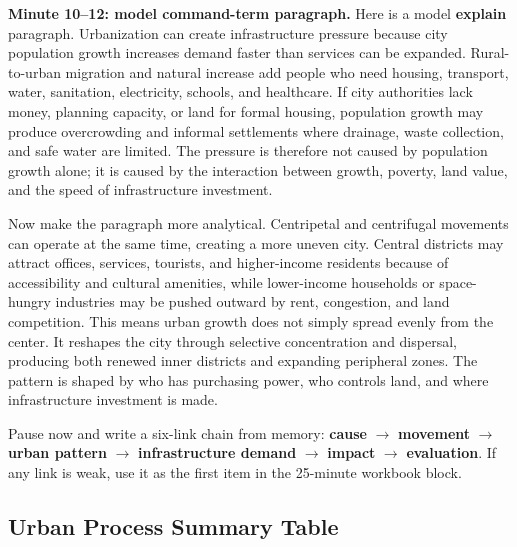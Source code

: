 \documentclass[11pt,a4paper]{article}
\newcommand{\term}[1]{\textcolor{HeadingBlue}{\textbf{#1}}}
\newcommand{\exam}[1]{\textcolor{AccentTeal}{\textbf{#1}}}
\begin{document}
\textbf{Minute 10--12: model command-term paragraph.}
Here is a model \exam{explain} paragraph. Urbanization can create
infrastructure pressure because city population growth increases demand faster
than services can be expanded. Rural-to-urban migration and natural increase add
people who need housing, transport, water, sanitation, electricity, schools, and
healthcare. If city authorities lack money, planning capacity, or land for
formal housing, population growth may produce overcrowding and informal
settlements where drainage, waste collection, and safe water are limited. The
pressure is therefore not caused by population growth alone; it is caused by the
interaction between growth, poverty, land value, and the speed of infrastructure
investment.

Now make the paragraph more analytical. Centripetal and centrifugal movements
can operate at the same time, creating a more uneven city. Central districts may
attract offices, services, tourists, and higher-income residents because of
accessibility and cultural amenities, while lower-income households or
space-hungry industries may be pushed outward by rent, congestion, and land
competition. This means urban growth does not simply spread evenly from the
center. It reshapes the city through selective concentration and dispersal,
producing both renewed inner districts and expanding peripheral zones. The
pattern is shaped by who has purchasing power, who controls land, and where
infrastructure investment is made.

Pause now and write a six-link chain from memory:
\term{cause} $\rightarrow$ \term{movement} $\rightarrow$ \term{urban pattern}
$\rightarrow$ \term{infrastructure demand} $\rightarrow$ \term{impact}
$\rightarrow$ \term{evaluation}. If any link is weak, use it as the first item
in the 25-minute workbook block.

\subsection{Urban Process Summary Table}
\end{document}
